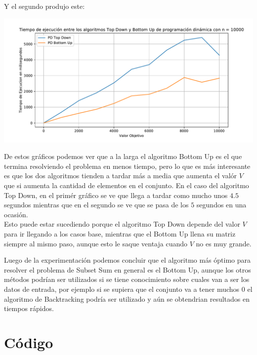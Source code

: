 \documentclass[a4paper]{article}
\begin{document}
Y el segundo produjo este:

\begin{center}
	\includegraphics[width=.8\linewidth]{G4.pdf}
\end{center}

De estos gráficos podemos ver que a la larga el algoritmo Bottom Up es el que termina resolviendo el problema en menos tiempo, pero lo que es más interesante es que los dos algoritmos tienden a tardar más a media que aumenta el valór $V$ que si aumenta la cantidad de elementos en el conjunto. En el caso del algoritmo Top Down, en el primér gráfico se ve que llega a tardar como mucho unos $4.5$ segundos mientras que en el segundo se ve que se pasa de los $5$ segundos en una ocasión.
\\
Esto puede estar sucediendo porque el algoritmo Top Down depende del valor $V$ para ir llegando a los casos base, mientras que el Bottom Up llena su matriz siempre al mismo paso, aunque esto le saque ventaja cuando $V$ no es muy grande.

Luego de la experimentación podemos concluir que el algoritmo más óptimo para resolver el problema de Subset Sum en general es el Bottom Up, aunque los otros métodos podrían ser utilizados si se tiene conocimiento sobre cuales van a ser los datos de entrada, por ejemplo si se supiera que el conjunto va a tener muchos 0 el algoritmo de Backtracking podría ser utilizado y aún se obtendrian resultados en tiempos rápidos.


\section{Código}

%
\end{document}
